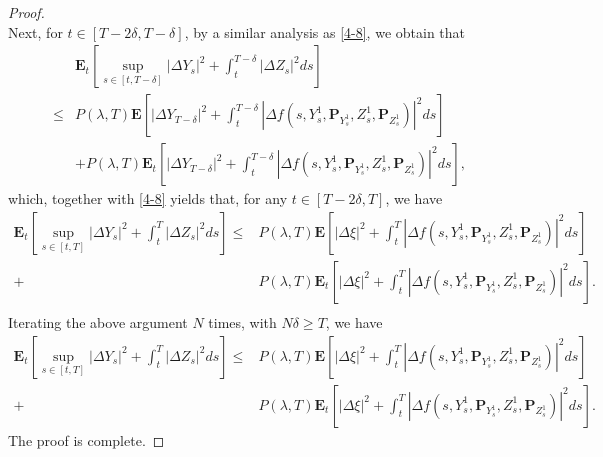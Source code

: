 \documentclass[10pt,a4paper]{amsart}
\def \E{\mathbf{E}}
\def \P{\mathbf{P}}
\begin{document}
\begin{proof}
\begin{equation}
 \end{equation}
 Next, for $t\in[T-2\delta,T-\delta]$, by a similar analysis as \eqref{4-8}, we obtain that 
\begin{equation*}
     \begin{split}\label{4-9}
        &\E_t\left[\sup_{s\in[t,T-\delta]}\left|\Delta Y_s\right|^2+\int_{t}^{T-\delta}\left|\Delta Z_s\right|^2 ds\right]\\
         \leq& P(\lambda,T)\E\left[\left|\Delta Y_{T-\delta}\right|^2+\int_{t}^{T-\delta}\left|\Delta f(s,Y_s^1,\P_{Y_s^1},Z_s^1,\P_{Z_s^1})\right|^2ds\right]\\
         &+ P(\lambda,T)\E_t\left[\left|\Delta Y_{T-\delta}\right|^2+\int_{t}^{T-\delta}\left|\Delta f(s,Y_s^1,\P_{Y_s^1},Z_s^1,\P_{Z_s^1})\right|^2ds\right],
     \end{split}
 \end{equation*}
 which, together with \eqref{4-8} yields that, for any $t\in[T-2\delta, T]$, we have
 \begin{equation*}
     \begin{split}\label{4-10}
        \E_t\left[\sup_{s\in[t,T]}\left|\Delta Y_s\right|^2+\int_{t}^{T}\left|\Delta Z_s\right|^2 ds\right]
         \leq& P(\lambda,T)\E\left[\left|\Delta\xi\right|^2+\int_{t}^{T}\left|\Delta f(s,Y_s^1,\P_{Y_s^1},Z_s^1,\P_{Z_s^1})\right|^2ds\right]\\
         +& P(\lambda,T)\E_t\left[\left|\Delta\xi\right|^2+\int_{t}^{T}\left|\Delta f(s,Y_s^1,\P_{Y_s^1},Z_s^1,\P_{Z_s^1})\right|^2ds\right].\\
     \end{split}
 \end{equation*}
 Iterating the above argument $N$ times, with $N\delta\geq T$, we have 
 \begin{equation*}
     \begin{split}\label{4-11}
        \E_t\left[\sup_{s\in[t,T]}\left|\Delta Y_s\right|^2+\int_{t}^{T}\left|\Delta Z_s\right|^2 ds\right]
         \leq& P(\lambda,T)\E\left[\left|\Delta\xi\right|^2+\int_{t}^{T}\left|\Delta f(s,Y_s^1,\P_{Y_s^1},Z_s^1,\P_{Z_s^1})\right|^2ds\right]\\
         +& P(\lambda,T)\E_t\left[\left|\Delta\xi\right|^2+\int_{t}^{T}\left|\Delta f(s,Y_s^1,\P_{Y_s^1},Z_s^1,\P_{Z_s^1})\right|^2ds\right].
     \end{split}
 \end{equation*}
 The proof is complete.\end{proof}
\end{document}
